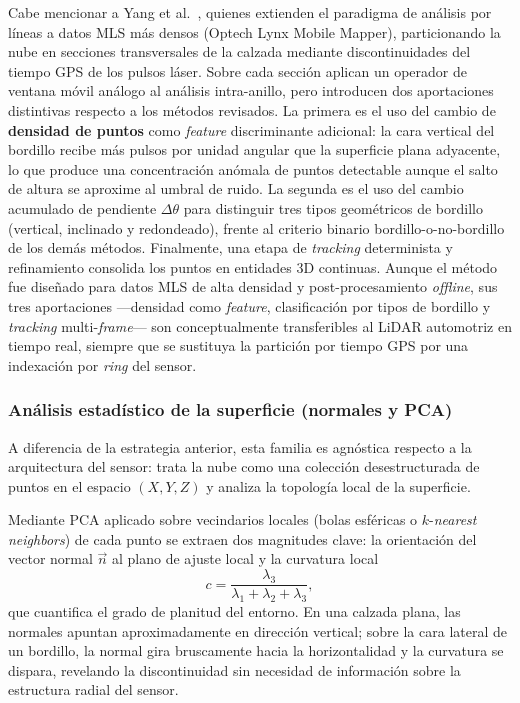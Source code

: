 Cabe mencionar a Yang et al.~\cite{yang2013mls}, quienes extienden el
paradigma de análisis por líneas a datos MLS más densos (Optech Lynx
Mobile Mapper), particionando la nube en secciones transversales de la
calzada mediante discontinuidades del tiempo GPS de los pulsos láser.
Sobre cada sección aplican un operador de ventana móvil análogo al
análisis intra-anillo, pero introducen dos aportaciones distintivas
respecto a los métodos revisados. La primera es el uso del cambio de
\textbf{densidad de puntos} como \textit{feature} discriminante
adicional: la cara vertical del bordillo recibe más pulsos por unidad
angular que la superficie plana adyacente, lo que produce una
concentración anómala de puntos detectable aunque el salto de altura se
aproxime al umbral de ruido. La segunda es el uso del cambio acumulado
de pendiente $\Delta \theta$ para distinguir tres tipos geométricos de
bordillo (vertical, inclinado y redondeado), frente al criterio binario
bordillo-o-no-bordillo de los demás métodos. Finalmente, una etapa de
\textit{tracking} determinista y refinamiento consolida los puntos en
entidades 3D continuas. Aunque el método fue diseñado para datos MLS de
alta densidad y post-procesamiento \textit{offline}, sus tres
aportaciones ---densidad como \textit{feature}, clasificación por tipos
de bordillo y \textit{tracking} multi-\textit{frame}--- son
conceptualmente transferibles al LiDAR automotriz en tiempo real,
siempre que se sustituya la partición por tiempo GPS por una
indexación por \textit{ring} del sensor.

\subsubsection{Análisis estadístico de la superficie (normales y PCA)}
\label{sec:curbs-pca}

A diferencia de la estrategia anterior, esta familia es agnóstica
respecto a la arquitectura del sensor: trata la nube como una colección
desestructurada de puntos en el espacio $(X, Y, Z)$ y analiza la
topología local de la superficie.

Mediante PCA aplicado sobre vecindarios locales (bolas esféricas o
$k$-\textit{nearest neighbors}) de cada punto se extraen dos magnitudes
clave: la orientación del vector normal $\vec{n}$ al plano de ajuste
local y la curvatura local
\begin{equation}
    c = \frac{\lambda_3}{\lambda_1 + \lambda_2 + \lambda_3},
\end{equation}
que cuantifica el grado de planitud del entorno. En una calzada plana,
las normales apuntan aproximadamente en dirección vertical; sobre la
cara lateral de un bordillo, la normal gira bruscamente hacia la
horizontalidad y la curvatura se dispara, revelando la discontinuidad
sin necesidad de información sobre la estructura radial del sensor.

